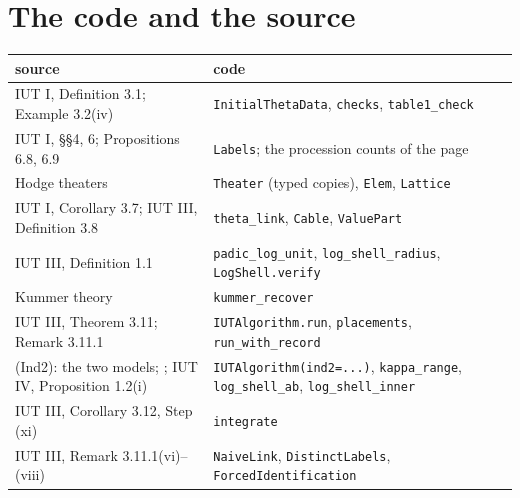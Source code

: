 \documentclass[11pt,a4paper]{article}
\newcommand{\code}[1]{\texttt{#1}}
\begin{document}
\section{The code and the source}\label{app:map}
\begin{center}\small
\begin{tabular}{>{\raggedright\arraybackslash}p{5.6cm}>{\raggedright\arraybackslash}p{8.4cm}}
\toprule
source & code\\
\midrule
IUT I, Definition 3.1; Example 3.2(iv) & \code{InitialThetaData}, \code{checks}, \code{table1\_check}\\
IUT I, \S\S4, 6; Propositions 6.8, 6.9 & \code{Labels}; the procession counts of the page\\
Hodge theaters & \code{Theater} (typed copies), \code{Elem}, \code{Lattice}\\
IUT I, Corollary 3.7; IUT III, Definition 3.8 & \code{theta\_link}, \code{Cable}, \code{ValuePart}\\
IUT III, Definition 1.1 & \code{padic\_log\_unit}, \code{log\_shell\_radius}, \code{LogShell.verify}\\
Kummer theory & \code{kummer\_recover}\\
IUT III, Theorem 3.11; Remark 3.11.1 & \code{IUTAlgorithm.run}, \code{placements}, \code{run\_with\_record}\\
(Ind2): the two models; \cite[Thms.~3.2, 3.3]{Gap}; IUT IV, Proposition 1.2(i) & \code{IUTAlgorithm(ind2=...)},
\code{kappa\_range}, \code{log\_shell\_ab}, \code{log\_shell\_inner}\\
IUT III, Corollary 3.12, Step (xi) & \code{integrate}\\
IUT III, Remark 3.11.1(vi)--(viii) & \code{NaiveLink}, \code{DistinctLabels}, \code{ForcedIdentification}\\
\bottomrule
\end{tabular}
\end{center}
\end{document}
